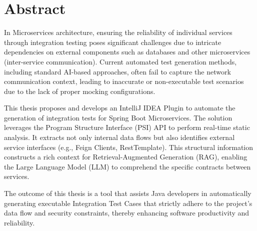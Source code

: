\section{Abstract}

In Microservices architecture, ensuring the reliability of individual services through integration testing poses significant challenges due to intricate dependencies on external components such as databases and other microservices (inter-service communication). Current automated test generation methods, including standard AI-based approaches, often fail to capture the network communication context, leading to inaccurate or non-executable test scenarios due to the lack of proper mocking configurations.

This thesis proposes and develops an IntelliJ IDEA Plugin to automate the generation of integration tests for Spring Boot Microservices. The solution leverages the Program Structure Interface (PSI) API to perform real-time static analysis. It extracts not only internal data flows but also identifies external service interfaces (e.g., Feign Clients, RestTemplate). This structural information constructs a rich context for Retrieval-Augmented Generation (RAG), enabling the Large Language Model (LLM) to comprehend the specific contracts between services.

The outcome of this thesis is a tool that assists Java developers in automatically generating executable Integration Test Cases that strictly adhere to the project's data flow and security constraints, thereby enhancing software productivity and reliability.

\clearpage
